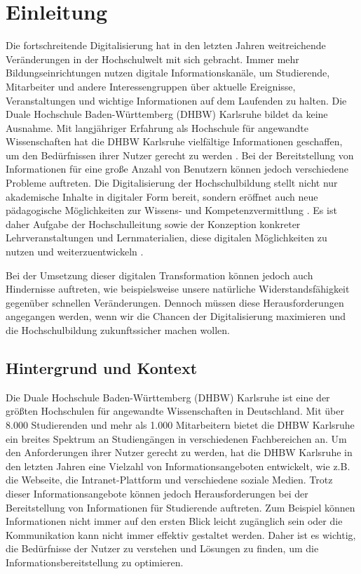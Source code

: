 \chapter{Einleitung}
Die fortschreitende Digitalisierung hat in den letzten Jahren weitreichende Veränderungen in der Hochschulwelt mit sich gebracht. Immer mehr Bildungseinrichtungen nutzen digitale Informationskanäle, um Studierende, Mitarbeiter und andere Interessengruppen über aktuelle Ereignisse, Veranstaltungen und wichtige Informationen auf dem Laufenden zu halten\cite{aachenerzeitung2022}. Die Duale Hochschule Baden-Württemberg (DHBW) Karlsruhe bildet da keine Ausnahme. 
Mit langjähriger Erfahrung als Hochschule für angewandte Wissenschaften hat die DHBW Karlsruhe vielfältige Informationen geschaffen, um den Bedürfnissen ihrer Nutzer gerecht zu werden \cite{degruyter2021}. Bei der Bereitstellung von Informationen für eine große Anzahl von Benutzern können jedoch verschiedene Probleme auftreten.  Die Digitalisierung der Hochschulbildung stellt nicht nur akademische Inhalte in digitaler Form bereit, sondern eröffnet auch neue pädagogische Möglichkeiten zur Wissens- und Kompetenzvermittlung \cite{hochschulforumdigitalisierung}. Es ist daher Aufgabe der Hochschulleitung sowie der Konzeption konkreter Lehrveranstaltungen und Lernmaterialien, diese digitalen Möglichkeiten zu nutzen und weiterzuentwickeln \cite{springerlink2023}. 

Bei der Umsetzung dieser digitalen Transformation können jedoch auch Hindernisse auftreten, wie beispielsweise unsere natürliche Widerstandsfähigkeit gegenüber schnellen Veränderungen\cite{degruyter2021_2}. Dennoch müssen diese Herausforderungen angegangen werden, wenn wir die Chancen der Digitalisierung maximieren und die Hochschulbildung zukunftssicher machen wollen.

\section{Hintergrund und Kontext}
Die Duale Hochschule Baden-Württemberg (DHBW) Karlsruhe ist eine der größten Hochschulen für angewandte Wissenschaften in Deutschland. Mit über 8.000 Studierenden und mehr als 1.000 Mitarbeitern bietet die DHBW Karlsruhe ein breites Spektrum an Studiengängen in verschiedenen Fachbereichen an. Um den Anforderungen ihrer Nutzer gerecht zu werden, hat die DHBW Karlsruhe in den letzten Jahren eine Vielzahl von Informationsangeboten entwickelt, wie z.B. die Webseite, die Intranet-Plattform und verschiedene soziale Medien.
Trotz dieser Informationsangebote können jedoch Herausforderungen bei der Bereitstellung von Informationen für Studierende auftreten. Zum Beispiel können Informationen nicht immer auf den ersten Blick leicht zugänglich sein oder die Kommunikation kann nicht immer effektiv gestaltet werden. Daher ist es wichtig, die Bedürfnisse der Nutzer zu verstehen und Lösungen zu finden, um die Informationsbereitstellung zu optimieren.


